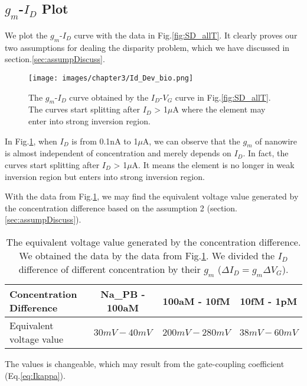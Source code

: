 \subsection{$g_m$-$I_D$ Plot} \label{section:disparityBio}
We plot the $g_m$-$I_D$ curve with the data in Fig.\ref{fig:SD_allT}.
It clearly proves our two assumptions for dealing the disparity problem, which we have discussed in section.\ref{sec:assumpDiscuss}.

\begin{figure}[htb]
        \texttt{[image: images/chapter3/Id\_Dev\_bio.png]}
    \caption{The $g_m$-$I_D$ curve obtained by the $I_D$-$V_G$ curve in Fig.\ref{fig:SD_allT}. The curves start splitting after $I_D$ > 1$\mu$A where the element may enter into strong inversion region.}
    \label{fig:gmId}
\end{figure}

In Fig.\ref{fig:gmId}, when $I_D$ is from 0.1nA to 1$\mu$A, we can observe that the $g_m$ of nanowire is almost independent of concentration and merely depends on $I_D$.
In fact, the curves start splitting after $I_D$ > 1$\mu$A.
It means the element is no longer in weak inversion region but enters into strong inversion region.

With the data from Fig.\ref{fig:gmId}, we may find the equivalent voltage value generated by the concentration difference based on the assumption 2 (section.\ref{sec:assumpDiscuss}).
\begin{table}[!htb]
    {\fontfamily{}\fontsize{10}{14}\selectfont
    \centering
    \begin{tabular}{l|c|c|c}
        Concentration Difference & Na\_PB - 100aM & 100aM - 10fM & 10fM - 1pM \\
        \hline
        Equivalent voltage value & $30mV - 40mV$ & $200mV - 280mV$ & $38mV - 60mV$ \\
    \end{tabular}
    \caption{The equivalent voltage value generated by the concentration difference. We obtained the data by the data from Fig.\ref{fig:gmId}. We divided the $I_D$ difference of different concentration by their $g_m$ ($\Delta I_D = g_m\Delta V_G$).}
    \label{tb:CdV}
    }
\end{table}
The values is changeable, which may result from the gate-coupling coefficient (Eq.\ref{eq:Ikappa}).










